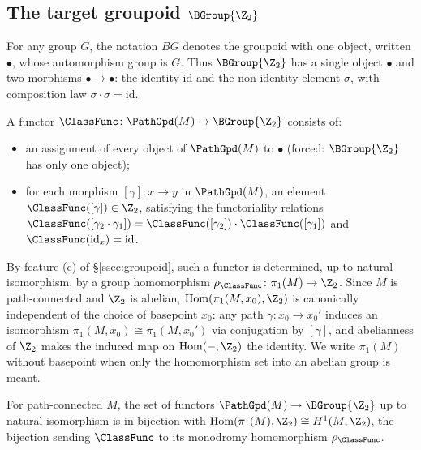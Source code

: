 \subsection{The target groupoid $\BGroup{\Z_2}$}\label{ssec:BZ2}

For any group $G$, the notation $BG$ denotes the groupoid with one
object, written $\bullet$, whose automorphism group is $G$. Thus
$\BGroup{\Z_2}$ has a single object $\bullet$ and two morphisms
$\bullet\to\bullet$: the identity $\mathrm{id}$ and the non-identity
element $\sigma$, with composition law $\sigma\cdot\sigma=\mathrm{id}$.

A functor $\ClassFunc\colon\PathGpd(M)\to\BGroup{\Z_2}$ consists of:
\begin{itemize}[leftmargin=2em]
\item an assignment of every object of $\PathGpd(M)$ to $\bullet$
(forced: $\BGroup{\Z_2}$ has only one object);
\item for each morphism $[\gamma]\colon x\to y$ in $\PathGpd(M)$, an
element $\ClassFunc([\gamma])\in\Z_2$, satisfying the functoriality
relations $\ClassFunc([\gamma_2\cdot\gamma_1])=\ClassFunc([\gamma_2])\cdot
\ClassFunc([\gamma_1])$ and $\ClassFunc(\mathrm{id}_x)=\mathrm{id}$.
\end{itemize}

By feature (c) of \S\ref{ssec:groupoid}, such a functor is determined,
up to natural isomorphism, by a group homomorphism
$\rho_{\ClassFunc}\colon\pi_1(M)\to\Z_2$. Since $M$ is path-connected
and $\Z_2$ is abelian, $\mathrm{Hom}(\pi_1(M,x_0),\Z_2)$ is canonically
independent of the choice of basepoint $x_0$: any path
$\gamma\colon x_0\to x_0'$ induces an isomorphism
$\pi_1(M,x_0)\cong\pi_1(M,x_0')$ via conjugation by $[\gamma]$, and
abelianness of $\Z_2$ makes the induced map on $\mathrm{Hom}(-,\Z_2)$
the identity. We write $\pi_1(M)$ without basepoint when only the
homomorphism set into an abelian group is meant.

\begin{lemma}\label{lem:functor-classification}
For path-connected $M$, the set of functors
$\PathGpd(M)\to\BGroup{\Z_2}$ up to natural isomorphism is in bijection
with $\mathrm{Hom}(\pi_1(M),\Z_2)\cong H^1(M,\Z_2)$, the bijection
sending $\ClassFunc$ to its monodromy homomorphism $\rho_{\ClassFunc}$.
\end{lemma}

